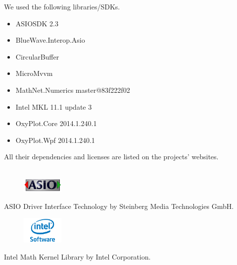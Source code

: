 \documentclass[final]{scrreprt} %
\begin{document}
We used the following libraries/SDKs.
\begin{itemize}
\item ASIOSDK 2.3
\item BlueWave.Interop.Asio
\item CircularBuffer
\item MicroMvvm
\item MathNet.Numerics master@83f222f02
\item Intel MKL 11.1 update 3
\item OxyPlot.Core 2014.1.240.1
\item OxyPlot.Wpf 2014.1.240.1
\end{itemize}
All their dependencies and licenses are listed on the projects' websites.
\\ \\
\begin{figure}[h]
	\includegraphics[width=2cm]{resources/ASIO_LOGO1.jpg}
\end{figure}
ASIO Driver Interface Technology by Steinberg Media Technologies GmbH.\\
\begin{figure}[h]
	\includegraphics[width=2cm]{resources/intel-logo.jpg}
\end{figure}
Intel Math Kernel Library by Intel Corporation.
\end{document}
